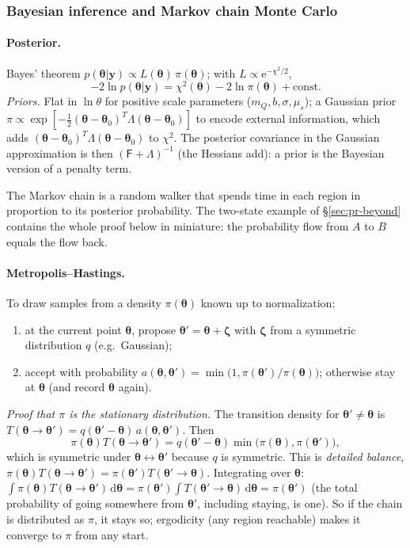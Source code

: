 \documentclass[11pt,a4paper]{article}
\numberwithin{equation}{section}
\theoremstyle{definition}
\theoremstyle{plain}
\theoremstyle{remark}
\newenvironment{plainwords}[1][In plain words]{\begin{tcolorbox}[plainbox,title={\small\bfseries #1},fonttitle=\small,coltitle=white,colbacktitle=ForestGreen!60!black]}{\end{tcolorbox}}
\numberwithin{algorithm}{section}
\newcommand{\dd}{\mathrm{d}}
\newcommand{\ee}{\mathrm{e}}
\newcommand{\mus}{\mu_s}
\newcommand{\sF}{\mathsf F}
\newcommand{\vth}{\bm\theta}
\begin{document}
\subsubsection{Bayesian inference and Markov chain Monte Carlo}
\paragraph{Posterior.} Bayes' theorem $p(\vth|\bm y)\propto L(\vth)\,\pi(\vth)$; with $L\propto\ee^{-\chi^2/2}$,
\begin{equation}
-2\ln p(\vth|\bm y)=\chi^2(\vth)-2\ln\pi(\vth)+\text{const}.
\end{equation}
\emph{Priors.} Flat in $\ln\theta$ for positive scale parameters ($m_Q,b,\sigma,\mus$); a Gaussian prior $\pi\propto\exp[-\frac12(\vth-\vth_0)^T\Lambda(\vth-\vth_0)]$ to encode external information, which adds $(\vth-\vth_0)^T\Lambda(\vth-\vth_0)$ to $\chi^2$. The posterior covariance in the Gaussian approximation is then $(\sF+\Lambda)^{-1}$ (the Hessians add): a prior is the Bayesian version of a penalty term.

\begin{plainwords}[In plain words]
The Markov chain is a random walker that spends time in each region in proportion to its posterior probability. The two-state example of \S\ref{sec:pr-beyond} contains the whole proof below in miniature: the probability flow from $A$ to $B$ equals the flow back.
\end{plainwords}

\paragraph{Metropolis--Hastings.} To draw samples from a density $\pi(\vth)$ known up to normalization:
\begin{enumerate}[leftmargin=1.5em,itemsep=2pt]
\item at the current point $\vth$, propose $\vth'=\vth+\bm\zeta$ with $\bm\zeta$ from a symmetric distribution $q$ (e.g.\ Gaussian);
\item accept with probability $a(\vth,\vth')=\min\big(1,\pi(\vth')/\pi(\vth)\big)$; otherwise stay at $\vth$ (and record $\vth$ again).
\end{enumerate}
\emph{Proof that $\pi$ is the stationary distribution.} The transition density for $\vth'\ne\vth$ is $T(\vth\to\vth')=q(\vth'-\vth)\,a(\vth,\vth')$. Then
\[
\pi(\vth)T(\vth\to\vth')=q(\vth'-\vth)\min\big(\pi(\vth),\pi(\vth')\big),
\]
which is symmetric under $\vth\leftrightarrow\vth'$ because $q$ is symmetric. This is \emph{detailed balance}, $\pi(\vth)T(\vth\to\vth')=\pi(\vth')T(\vth'\to\vth)$. Integrating over $\vth$: $\int\pi(\vth)T(\vth\to\vth')\,\dd\vth=\pi(\vth')\int T(\vth'\to\vth)\,\dd\vth=\pi(\vth')$ (the total probability of going somewhere from $\vth'$, including staying, is one). So if the chain is distributed as $\pi$, it stays so; ergodicity (any region reachable) makes it converge to $\pi$ from any start.
\end{document}
